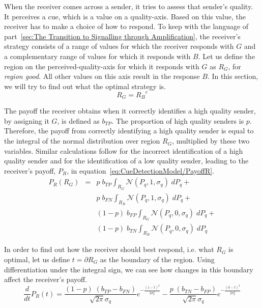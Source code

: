\documentclass[a4paper,12pt]{article}
\numberwithin{equation}{section}
\begin{document}
When the receiver comes across a sender, it tries to assess that sender's quality. It perceives a cue, which is a value on a quality-axis. Based on this value, the receiver has to make a choice of how to respond. To keep with the language of part~\ref{sec:The Transition to Signalling through Amplification}, the receiver's strategy consists of a range of values for which the receiver responds with $G$ and a complementary range of values for which it responds with $B$. Let us define the region on the perceived-quality-axis for which it responds with $G$ as $R_{G}$, for \textit{region good}. All other values on this axis result in the response $B$. In this section, we will try to find out what the optimal strategy is.
\begin{equation}
\label{eq:CueDetectionModel/RegionG}
R_{G} = {R_{B}}^{c}
\end{equation}

The payoff the receiver obtains when it correctly identifies a high quality sender, by assigning it $G$, is defined as $b_{TP}$. The proportion of high quality senders is $p$. Therefore, the payoff from correctly identifying a high quality sender is equal to the integral of the normal distribution over region $R_{G}$, multiplied by these two variables. Similar calculations follow for the incorrect identification of a high quality sender and for the identification of a low quality sender, leading to the receiver's payoff, $P_{R}$, in equation~\ref{eq:CueDetectionModel/PayoffR}.
\begin{equation}
\label{eq:CueDetectionModel/PayoffR}
\begin{array}{rcl}
P_{R}(R_{G}) &=& p \; b_{TP} 
\displaystyle\int_{R_{G}} \mathcal{N}(P_{q}, 1, \sigma_{q}) \; dP_{q} +\\
&&p \; b_{FN} \displaystyle \int_{R_{B}} \mathcal{N}(P_{q}, 1, \sigma_{q}) \; dP_{q} +\\
&&(1-p) \; b_{FP} \displaystyle \int_{R_{G}} \mathcal{N}(P_{q}, 0, \sigma_{q}) \; dP_{q} +\\
&&(1-p) \; b_{TN} \displaystyle \int_{R_{B}} \mathcal{N}(P_{q}, 0, \sigma_{q}) \; dP_{q}
\end{array}
\end{equation}

In order to find out how the receiver should best respond, i.e. what $R_{G}$ is optimal, let us define $t=\partial R_{G}$ as the boundary of the region. Using differentiation under the integral sign, we can see how changes in this boundary affect the receiver's payoff.
\begin{equation}
\label{eq:CueDetectionModel/DifferentialPayoffR}
\frac{d}{dt}P_{R}(t)= \frac{(1-p) \; (b_{TP}-b_{FN})}{\sqrt{2 \pi} \sigma_{q}} e^{-\frac{(1-t)^2}{2 \sigma_{q}^2}} - \frac{p \; (b_{TN}-b_{FP})}{\sqrt{2 \pi} \sigma_{q}} e^{-\frac{(0-t)^2}{2 \sigma_{q}^2}}
\end{equation}
\end{document}
